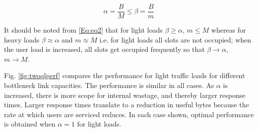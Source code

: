 \documentclass[conference]{../../IEEEtran}
\begin{document}
\begin{equation}
\label{Eq:eq2}
\alpha = \frac{B}{M} \leq \beta = \frac{B}{m}
\end{equation}

It should be noted from \eqref{Eq:eq2} that for light loads $\beta \geq \alpha$, $ m \leq M$ whereas for heavy loads $\beta \approx \alpha$ and $m \approx M$ i.e. for light loads all slots are not occupied; when the user load is increased, all slots get occupied frequently so that $\beta \rightarrow \alpha$, $m \rightarrow M$.
\begin{comment}
	\begin{figure*}[hbt]
		\begin{center}
		\subcaptionbox{\label{fig:lresp}}{\texttt{[image: ../../images/twoqlperfresp.eps]}}
		\subcaptionbox{{\label{fig:luseful}}{\texttt{[image: ../../images/twoqlperfuseful.eps]}}
		\subcaptionbox{\label{fig:ldrop}}{\texttt{[image: ../../images/twoqlperfdrop.eps]}}\\
		\subcaptionbox{\label{fig:hresp}}{\texttt{[image: ../../images/twoqperfresp.eps]}}
		\subcaptionbox{\label{fig:huseful}}{\texttt{[image: ../../images/twoqperfuseful.eps]}}
		\subcaptionbox{\label{fig:hdrop}}{\texttt{[image: ../../images/twoqperfdrop.eps]}}		
		\caption{Comparison of performance - single category}
		\label{fig:twoqlperf}
		\end{center}
	\end{figure*}	
\end{comment}




Fig. \ref{fig:twoqlperf} compares the performance for light traffic loads for different bottleneck link capacities. The performance is similar in all cases. As $\alpha$ is increased, there is more scope for internal wastage, and thereby larger response times. Larger response times translate to a reduction in useful bytes because the rate at which users are serviced reduces. In each case shown, optimal performance is obtained when  $\alpha=1$ for light loads. 
\end{document}
